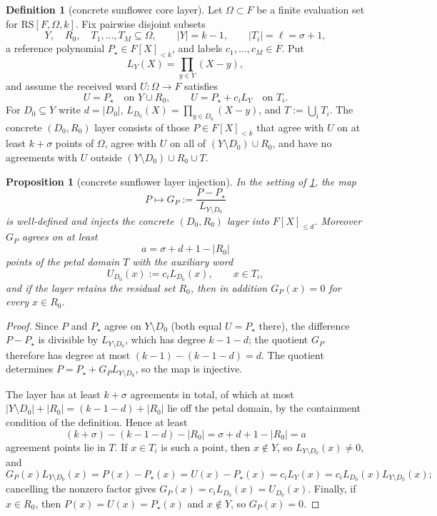 \documentclass[11pt]{article}
\newtheorem{proposition}[proposition]{Proposition}
\theoremstyle{definition}
\newtheorem{definition}[definition]{Definition}
\theoremstyle{remark}
\newcommand{\RS}{\mathrm{RS}}
\begin{document}
\begin{definition}[concrete sunflower core layer]\label{def:capf-concrete-sunflower}
Let $\Omega\subset F$ be a finite evaluation set for $\RS[F,\Omega,k]$.  Fix pairwise disjoint subsets
\[
        Y,\quad R_0,\quad T_1,\ldots,T_M\subseteq\Omega,
        \qquad |Y|=k-1,
        \qquad |T_i|=\ell=\sigma+1,
\]
a reference polynomial $P_\star\in F[X]_{<k}$, and labels $c_1,\ldots,c_M\in F$.  Put
\[
        L_Y(X)=\prod_{y\in Y}(X-y),
\]
and assume the received word $U:\Omega\to F$ satisfies
\[
        U=P_\star\quad\text{on }Y\cup R_0,
        \qquad
        U=P_\star+c_iL_Y\quad\text{on }T_i .
\]
For $D_0\subseteq Y$ write $d=|D_0|$, $L_{D_0}(X)=\prod_{y\in D_0}(X-y)$, and $T:=\bigcup_iT_i$.  The concrete $(D_0,R_0)$ layer consists of those $P\in F[X]_{<k}$ that agree with $U$ on at least $k+\sigma$ points of $\Omega$, agree with $U$ on all of $(Y\setminus D_0)\cup R_0$, and have no agreements with $U$ outside $(Y\setminus D_0)\cup R_0\cup T$.
\end{definition}

\begin{proposition}[concrete sunflower layer injection]\label{prop:capf-concrete-sunflower}
In the setting of \cref{def:capf-concrete-sunflower}, the map
\[
        P\longmapsto
        G_P:=\frac{P-P_\star}{L_{Y\setminus D_0}}
\]
is well-defined and injects the concrete $(D_0,R_0)$ layer into $F[X]_{\le d}$.  Moreover $G_P$ agrees on at least
\[
        a=\sigma+d+1-|R_0|
\]
points of the petal domain $T$ with the auxiliary word
\[
        U_{D_0}(x):=c_iL_{D_0}(x),\qquad x\in T_i,
\]
and if the layer retains the residual set $R_0$, then in addition $G_P(x)=0$ for every $x\in R_0$.
\end{proposition}

\begin{proof}
Since $P$ and $P_\star$ agree on $Y\setminus D_0$ \textup{(both equal $U=P_\star$ there)}, the difference $P-P_\star$ is divisible by $L_{Y\setminus D_0}$, which has degree $k-1-d$; the quotient $G_P$ therefore has degree at most $(k-1)-(k-1-d)=d$.  The quotient determines $P=P_\star+G_PL_{Y\setminus D_0}$, so the map is injective.

The layer has at least $k+\sigma$ agreements in total, of which at most $|Y\setminus D_0|+|R_0|=(k-1-d)+|R_0|$ lie off the petal domain, by the containment condition of the definition.  Hence at least
\[
        (k+\sigma)-(k-1-d)-|R_0|=\sigma+d+1-|R_0|=a
\]
agreement points lie in $T$.  If $x\in T_i$ is such a point, then $x\notin Y$, so $L_{Y\setminus D_0}(x)\ne0$, and
\[
        G_P(x)L_{Y\setminus D_0}(x)
        =P(x)-P_\star(x)
        =U(x)-P_\star(x)
        =c_iL_Y(x)
        =c_iL_{D_0}(x)L_{Y\setminus D_0}(x);
\]
cancelling the nonzero factor gives $G_P(x)=c_iL_{D_0}(x)=U_{D_0}(x)$.  Finally, if $x\in R_0$, then $P(x)=U(x)=P_\star(x)$ and $x\notin Y$, so $G_P(x)=0$.
\end{proof}
\end{document}

